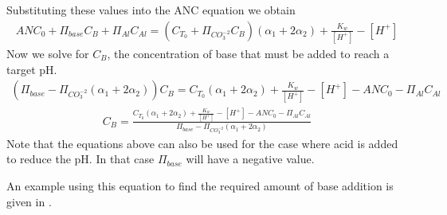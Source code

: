 \documentclass[letterpaper,10pt,english]{sphinxmanual}
\begin{document}
Substituting these values into the ANC equation we obtain
\begin{equation}\label{equation:Rapid_Mix/RM_Derivations:Rapid_Mix/RM_Derivations:19}
\begin{split}ANC_0 + \Pi_{base}C_B + \Pi_{Al}C_{Al} = ({C_{T_0}}+ \Pi_{CO_3^{-2}}C_B)({\alpha_1} + 2{\alpha_2}) +  \frac{{{K_w}}}{{\left[ {{H^ + }} \right]}} - \left[ {{H^ + }} \right]\end{split}
\end{equation}
Now we solve for \(C_B\), the concentration of base that must be added to reach a target pH.
\begin{equation}\label{equation:Rapid_Mix/RM_Derivations:Rapid_Mix/RM_Derivations:20}
\begin{split}(\Pi_{base} -\Pi_{CO_3^{-2}}({\alpha_1} + 2{\alpha_2}) )C_B= {C_{T_0}}({\alpha_1} + 2{\alpha_2}) +  \frac{{{K_w}}}{{\left[ {{H^ + }} \right]}} - \left[ {{H^ + }} \right] - ANC_0 - \Pi_{Al}C_{Al}\end{split}
\end{equation}\begin{equation}\label{equation:Rapid_Mix/RM_Derivations:Base_for_pH_Adjust}
\begin{split}C_B= \frac{{C_{T_0}}({\alpha_1} + 2{\alpha_2}) +  \frac{{{K_w}}}{{\left[ {{H^ + }} \right]}} - \left[ {{H^ + }} \right] - ANC_0 - \Pi_{Al}C_{Al}}{\Pi_{base} -\Pi_{CO_3^{-2}}({\alpha_1} + 2{\alpha_2})}\end{split}
\end{equation}
Note that the equations above can also be used for the case where acid is added to reduce the pH. In that case \(\Pi_{base}\) will have a negative value.

An example using this equation to find the required amount of base addition is given in {\hyperref[\detokenize{Rapid_Mix/RM_Examples:heading-example-ph-adjustment}]{}}.
\end{document}
